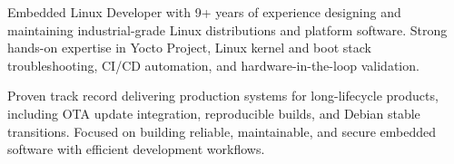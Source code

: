 

\begin{cvparagraph}

Embedded Linux Developer with 9+ years of experience designing and maintaining industrial-grade Linux distributions and platform software. Strong hands-on expertise in Yocto Project, Linux kernel and boot stack troubleshooting, CI/CD automation, and hardware-in-the-loop validation.

Proven track record delivering production systems for long-lifecycle products, including OTA update integration, reproducible builds, and Debian stable transitions. Focused on building reliable, maintainable, and secure embedded software with efficient development workflows.
\end{cvparagraph}
